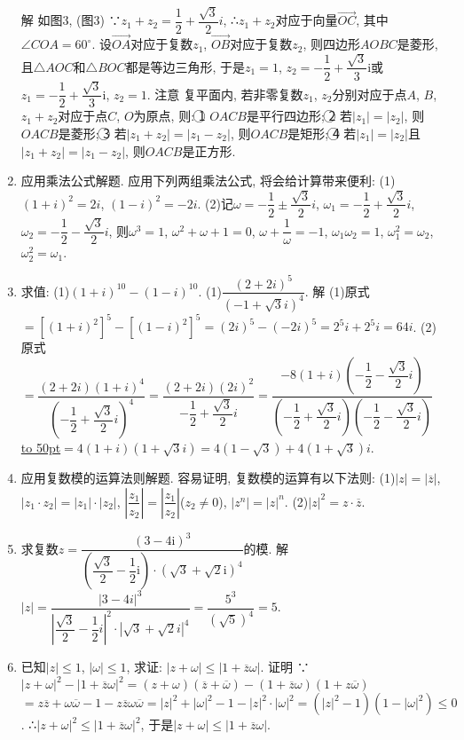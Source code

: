 \documentclass[10pt,a4paper]{article}
\newcommand{\blank}[1]{\underline{\hbox to #1pt{}}}
\begin{document}
\begin{enumerate}[1.]
解  如图3,
(图3)
∵$z_1+z_2=\dfrac 12+\dfrac{\sqrt 3}2i$,
∴$z_1+z_2$对应于向量$\overrightarrow{OC}$, 其中$\angle COA=60^{\circ }$.
设$\overrightarrow{OA}$对应于复数$z_1$, $\overrightarrow{OB}$对应于复数$z_2$, 则四边形$AOBC$是菱形, 且$\triangle AOC$和$\triangle BOC$都是等边三角形, 于是$z_1=1$, $z_2=-\dfrac 12+\dfrac{\sqrt 3}3\mathrm{i}$或$z_1=-\dfrac 12+\dfrac{\sqrt 3}3\mathrm{i}$, $z_2=1$.
注意  复平面内, 若非零复数$z_1$, $z_2$分别对应于点$A$, $B$, $z_1+z_2$对应于点$C$, $O$为原点, 则:
\textcircled{1} $OACB$是平行四边形;
\textcircled{2} 若$|z_1|=|z_2|$, 则$OACB$是菱形;
\textcircled{3} 若$|z_1+z_2|=|z_1-z_2|$, 则$OACB$是矩形;
\textcircled{4} 若$|z_1|=|z_2|$且$|z_1+z_2|=|z_1-z_2|$, 则$OACB$是正方形.
\item 应用乘法公式解题.
应用下列两组乘法公式, 将会给计算带来便利:
(1)$(1+i)^2=2i$, $(1-i)^2=-2i$.
(2)记$\omega =-\dfrac 12\pm \dfrac{\sqrt 3}2i$, $\omega _1=-\dfrac 12+\dfrac{\sqrt 3}2i$, $\omega _2=-\dfrac 12-\dfrac{\sqrt 3}2i$,
则$\omega ^3=1$, $\omega ^2+\omega +1=0$, $\omega +\dfrac 1{\omega }=-1$, $\omega _1\omega _2=1$, $\omega _1^2=\omega _2$, $\omega _2^2=\omega _1$.
\item 求值:
(1)$(1+i)^{10}-(1-i)^{10}$.
(1)$\dfrac{{{(2+2i)}^5}}{{{(-1+\sqrt 3i)}^4}}$.
解  (1)原式$=[(1+i)^2]^5-[(1-i)^2]^5=(2i)^5-(-2i)^5=2^5i+2^5i=64i$.
(2)原式$=\dfrac{(2+2i){{(1+i)}^4}}{{{(-\dfrac 12+\dfrac{\sqrt 3}2i)}^4}}=\dfrac{(2+2i){{(2i)}^2}}{-\dfrac 12+\dfrac{\sqrt 3}2i}=\dfrac{-8(1+i)(-\dfrac 12-\dfrac{\sqrt 3}2i)}{(-\dfrac 12+\dfrac{\sqrt 3}2i)(-\dfrac 12-\dfrac{\sqrt 3}2i)}$
\blank{50}$=4(1+i)(1+\sqrt 3i)=4(1-\sqrt 3)+4(1+\sqrt 3)i$.
\item 应用复数模的运算法则解题.
容易证明, 复数模的运算有以下法则:
(1)$|z|=|\overline z|$, $|z_1\cdot z_2|=|z_1|\cdot|z_2|$, $|\dfrac{z_1}{z_2}|=|\dfrac{z_1}{z_2}|$($z_2\ne 0$), $|z^n|=|z|^n$.
(2)$|z|^2=z\cdot \overline z$.
\item 求复数$z=\dfrac{{{(3-4\mathrm{i})}^3}}{(\dfrac{\sqrt 3}2-\dfrac 12\mathrm{i})\cdot {{(\sqrt 3+\sqrt 2\mathrm{i})}^4}}$的模.
解  $|z|=\dfrac{{{|3-4i|}^3}}{{{|\dfrac{\sqrt 3}2-\dfrac 12i|}^2}\cdot {{|\sqrt 3+\sqrt 2i|}^4}}=\dfrac{5^3}{{{(\sqrt 5)}^4}}=5$.
\item 已知$|z|\le 1$, $|\omega|\le 1$, 求证: $|z+\omega|\le|1+\overline z\omega|$.
证明  ∵$|z+\omega|^2-|1+\overline z\omega|^2=(z+\omega)(\overline z+\overline \omega)-(1+\overline z\omega)(1+z\overline \omega)$
$=z\overline z+\omega \overline \omega -1-z\overline z\omega \overline \omega =|z|^2+|\omega|^2-1-|z|^2\cdot|\omega|^2=(|z|^2-1)(1-|\omega|^2)\le 0$.
∴$|z+\omega|^2\le|1+\overline z\omega|^2$, 于是$|z+\omega|\le|1+\overline z\omega|$.

\end{enumerate}
\end{document}
